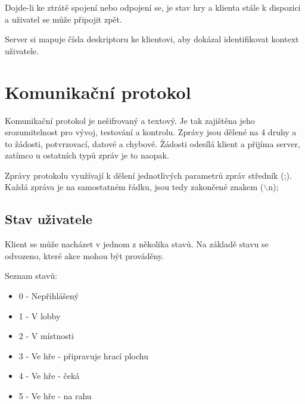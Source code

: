 \documentclass[12pt, a4paper]{article} %
\begin{document}
	\par Dojde-li ke ztrátě spojení nebo odpojení se, je stav hry a klienta stále k dispozici a uživatel se může připojit zpět.
	\par Server si mapuje čísla deskriptoru ke klientovi, aby dokázal identifikovat kontext uživatele.

	\section{Komunikační protokol}
	\par Komunikační protokol je nešifrovaný a textový. Je tak zajištěna jeho srozumitelnost pro vývoj, testování a kontrolu. Zprávy jsou dělené na 4 druhy a to žádosti, potvrzovací, datové a chybové. Žádosti odesílá klient a přijíma server, zatímco u ostatních typů zpráv je to naopak.
	
	\par Zprávy protokolu využívají k dělení jednotlivých parametrů zpráv středník (;). Každá zpráva je na samostatném řádku, jsou tedy zakončené znakem ($\backslash$n);
	
	\subsection{Stav uživatele}
	\par Klient se může nacházet v jednom z několika stavů. Na základě stavu se odvozeno, které akce mohou být prováděny.
	
	\par Seznam stavů:
	\begin{itemize}
		\item 0 - Nepřihlášený
		\item 1 - V lobby
		\item 2 - V místnosti
		\item 3 - Ve hře - připravuje hrací plochu
		\item 4 - Ve hře - čeká
		\item 5 - Ve hře - na rahu

	\end{itemize}
\end{document}
